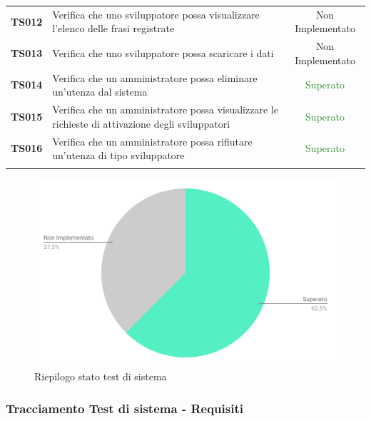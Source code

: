 \begin{tabularx}{\textwidth}{cXc}
	\textbf{TS012} & Verifica che uno sviluppatore possa visualizzare l’elenco delle frasi registrate & Non Implementato \\
	\textbf{TS013} & Verifica che uno sviluppatore possa scaricare i dati & Non Implementato \\
	\textbf{TS014} & Verifica che un amministratore possa eliminare un'utenza dal sistema & \textcolor{ForestGreen}{Superato} \\
	\textbf{TS015} & Verifica che un amministratore possa visualizzare le richieste di attivazione degli sviluppatori & \textcolor{ForestGreen}{Superato} \\
	\textbf{TS016} & Verifica che un amministratore possa rifiutare un'utenza di tipo sviluppatore & \textcolor{ForestGreen}{Superato} \\
	
	\rowcolor{white}
	\caption{Test di sistema}
	\label{tab:tabellatestsistema}
\end{tabularx}

\begin{figure}[H]
	\centering
	\includegraphics[width=0.7\linewidth]{sez/test/img/statoTestSistema.pdf}
	\caption{Riepilogo stato test di sistema}
\end{figure}

\subsubsection{Tracciamento Test di sistema - Requisiti}

